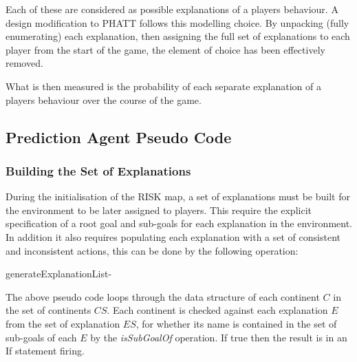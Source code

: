 \documentclass[parskip]{cs4rep}
\begin{document}
Each of these are considered as possible explanations of a players behaviour. A design modification to PHATT follows this modelling choice. By unpacking (fully enumerating) each explanation, then assigning the full set of explanations to each player from the start of the game, the element of choice has been effectively removed. 

What is then measured is the probability of each separate explanation of a players behaviour over the course of the game.

\subsection{Prediction Agent Pseudo Code}

\subsubsection{Building the Set of Explanations}

During the initialisation of the RISK map, a set of explanations must be built for the environment to be later assigned to players. This require the explicit specification of a root goal and sub-goals for each explanation in the environment. In addition it also requires populating each explanation with a set of consistent and inconsistent actions, this can be done by the following operation:

\begin{pseudocode}[ruled]{generateExplanationList}{-}
\begin{algorithm}[H]
\end{algorithm}
\end{pseudocode}

The above pseudo code loops through the data structure of each continent $C$ in the set of continents $CS$. Each continent is checked against each explanation $E$ from the set of explanation $ES$, for whether its name is contained in the set of sub-goals of each $E$ by the \textit{isSubGoalOf} operation. If true then the result is in an If statement firing. 
\end{document}
